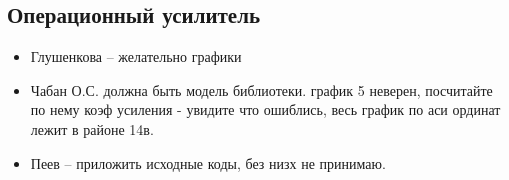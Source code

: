 \subsection*{Операционный усилитель}
\begin{itemize}
\item Глушенкова -- желательно графики
\item Чабан О.С. должна быть модель библиотеки. график 5 неверен, посчитайте по нему коэф усиления - увидите что ошиблись, весь график по аси ординат лежит в районе 14в.
\item Пеев  -- приложить исходные коды, без низх не принимаю.
\end{itemize}

